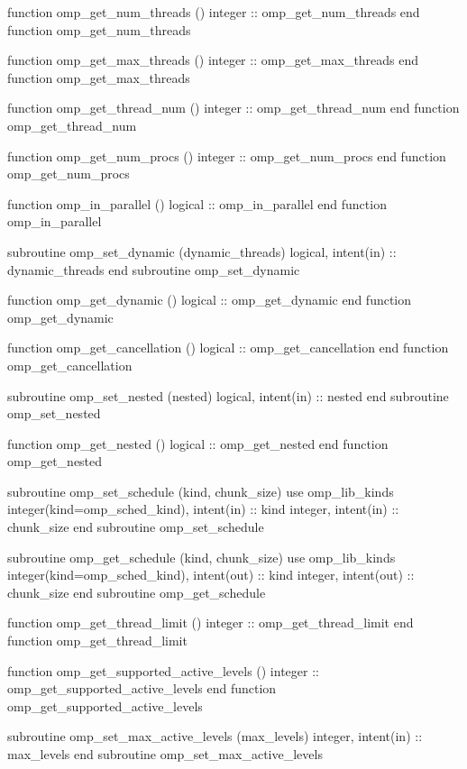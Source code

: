 {\begin{ompfFunction}
          function omp_get_num_threads ()
           integer :: omp_get_num_threads
          end function omp_get_num_threads

          function omp_get_max_threads ()
           integer :: omp_get_max_threads
          end function omp_get_max_threads

          function omp_get_thread_num ()
           integer :: omp_get_thread_num
          end function omp_get_thread_num

          function omp_get_num_procs ()
           integer :: omp_get_num_procs
          end function omp_get_num_procs

          function omp_in_parallel ()
           logical :: omp_in_parallel
          end function omp_in_parallel

          subroutine omp_set_dynamic (dynamic_threads)
           logical, intent(in) :: dynamic_threads
          end subroutine omp_set_dynamic

          function omp_get_dynamic ()
           logical :: omp_get_dynamic
          end function omp_get_dynamic

          function omp_get_cancellation ()
           logical :: omp_get_cancellation
          end function omp_get_cancellation

          subroutine omp_set_nested (nested)
           logical, intent(in) :: nested
          end subroutine omp_set_nested

          function omp_get_nested ()
           logical :: omp_get_nested
          end function omp_get_nested

          subroutine omp_set_schedule (kind, chunk_size)
           use omp_lib_kinds
           integer(kind=omp_sched_kind), intent(in) :: kind
           integer, intent(in) :: chunk_size
          end subroutine omp_set_schedule

          subroutine omp_get_schedule (kind, chunk_size)
           use omp_lib_kinds
           integer(kind=omp_sched_kind), intent(out) :: kind
           integer, intent(out) :: chunk_size
          end subroutine omp_get_schedule

          function omp_get_thread_limit ()
           integer :: omp_get_thread_limit
          end function omp_get_thread_limit

          function omp_get_supported_active_levels ()
           integer :: omp_get_supported_active_levels
          end function omp_get_supported_active_levels

          subroutine omp_set_max_active_levels (max_levels)
           integer, intent(in) :: max_levels
          end subroutine omp_set_max_active_levels


\end{ompfFunction}}
